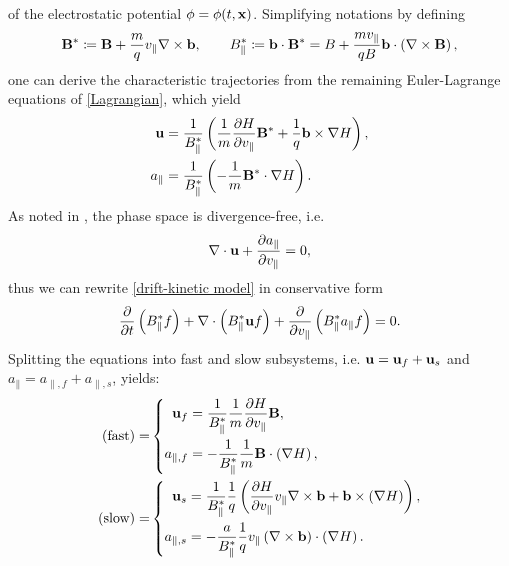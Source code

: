 of the electrostatic potential $\phi = \phi(t, \mathbf{x})$. 
Simplifying notations by defining
	\begin{equation}
		\mathbf{B}^\ast  \coloneqq \mathbf{B} + \frac{m}{q}v_\parallel \nabla \times \mathbf{b} , \qquad
		B_\parallel^\ast  \coloneqq \mathbf{b} \cdot \mathbf{B}^\ast = B + \frac{m v_\parallel}{q B} \mathbf{b} \cdot \left( \nabla \times \mathbf{B} \right),
	\end{equation}
one can derive the characteristic trajectories from the remaining Euler-Lagrange equations of \eqref{Lagrangian}, which yield
\begin{subequations}
	\begin{align}
		\mathbf{u}  & = \frac{1}{B_\parallel^\ast} \left( \frac{1}{m} \frac{\partial H}{\partial v_\parallel} \mathbf{B}^\ast + \frac{1}{q} \mathbf{b} \times \nabla H \right) \label{eom for bu}, \\
		a_\parallel & = \frac{1}{B_\parallel^\ast} \left( -\frac{1}{m} \mathbf{B}^\ast \cdot  \nabla H  \right). \label{eom for ap}
	\end{align}
\end{subequations}
As noted in \cite{Latu_2017}, the phase space is divergence-free, i.e.
\begin{equation}
	\nabla \cdot \mathbf{u} + \frac{\partial a_\parallel}{\partial v_\parallel} = 0,
\end{equation}
thus we can rewrite \eqref{drift-kinetic model} in conservative form
\begin{equation}\label{conservation1}
	\frac{\partial }{\partial t}\left(B_\parallel^\ast f\right) + \nabla\cdot\left( B_\parallel^\ast \mathbf{u} f \right) + \frac{\partial }{\partial v_\parallel} \left( B_\parallel^\ast a_\parallel f \right) = 0.
\end{equation}
Splitting the equations into fast and slow subsystems, i.e. $\mathbf{u} = \mathbf{u}_f + \mathbf{u}_s$ and $a_{\parallel} = a_{\parallel, f} + a_{\parallel, s}$, yields:
\begin{subequations}
	\begin{align}
		(\text{fast}) = & \left\{ \begin{aligned}
			\mathbf{u}_f & = \frac{1}{B_\parallel^\ast} \frac{1}{m} \frac{\partial H}{\partial v_\parallel} \mathbf{B}, \\
			a_{\parallel, f} & = -\frac{1}{B_\parallel^\ast} \frac{1}{m} \mathbf{B} \cdot \left( \nabla H \right),
		\end{aligned} \right. \label{split step fast}\\
		(\text{slow}) = &  \left\{ \begin{aligned}
			\mathbf{u}_s & = \frac{1}{B_\parallel^\ast} \frac{1}{q} \left( \frac{\partial H}{\partial v_\parallel} v_\parallel \nabla \times \mathbf{b} + \mathbf{b} \times \left(\nabla H\right) \right), \\
			a_{\parallel, s} & = - \frac{a}{B_\parallel^\ast} \frac{1}{q} v_\parallel \left( \nabla \times \mathbf{b} \right) \cdot \left( \nabla H \right).
		\end{aligned} \right. \label{split step slow}
	\end{align}
\end{subequations}
